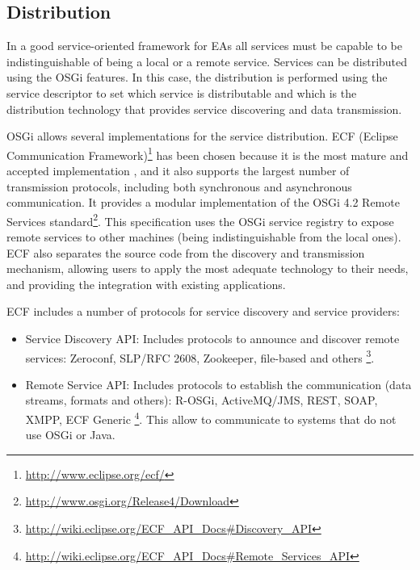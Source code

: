 \documentclass{sig-alternate}
\begin{document}

\subsection{Distribution}
In a good service-oriented framework for EAs all services must be capable to be indistinguishable of being a local or a remote service. Services can be distributed using the OSGi features. In this case, the distribution is performed using the service descriptor to set which service is distributable and which is the distribution technology that provides service discovering and data transmission.

OSGi allows several implementations for the service distribution. ECF (Eclipse Communication Framework)\footnote{\url{http://www.eclipse.org/ecf/}} has been chosen because it is the most mature and accepted implementation \cite{petzold2011dynamic}, and it also supports the largest number of transmission protocols, including both synchronous and asynchronous communication. It provides a modular implementation of the OSGi 4.2 Remote Services standard\footnote{\url{http://www.osgi.org/Release4/Download}}. This specification uses the OSGi service registry to expose remote services to other machines (being indistinguishable from the local ones). ECF also separates the source code from the discovery and transmission mechanism, allowing users to apply the most adequate technology to their needs, and providing the integration with existing applications. %

ECF includes a number of protocols for service discovery and service providers:
\begin{itemize}
\item Service Discovery API: Includes protocols to announce and discover remote services: Zeroconf, SLP/RFC 2608, Zookeeper, file-based and others \footnote{\url{http://wiki.eclipse.org/ECF_API_Docs#Discovery_API}}.
\item Remote Service API: Includes protocols to establish the communication (data streams, formats and others): R-OSGi, ActiveMQ/JMS, REST, SOAP, XMPP, ECF Generic \footnote{\url{http://wiki.eclipse.org/ECF_API_Docs#Remote_Services_API}}. This allow to communicate to systems that do not use OSGi or Java.
\end{itemize}
\end{document}
